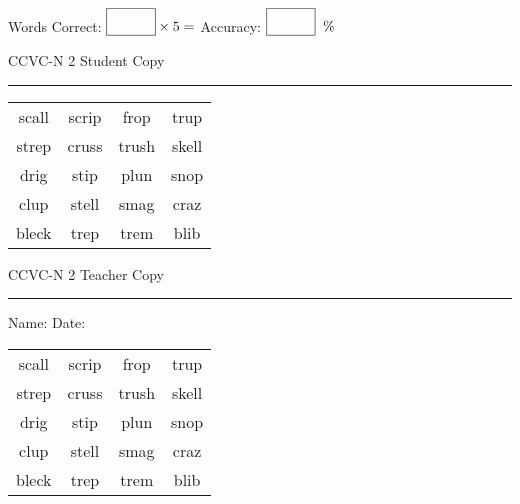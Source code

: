 \documentclass{memoir}
\begin{document}
\small

Words Correct: $\fbox{\phantom{\huge 100}} \times 5 = $ Accuracy: $\fbox{\phantom{\huge 100}}\;\; \%$ 

\vfill

\newpage


\footnotesize \noindent
CCVC-N 2 \hfill Student Copy
\smallskip
\hrule

\Large

\setlength{\tabcolsep}{14pt}
\def\arraystretch{3}

{\selectfont


\begin{vplace}[0.5]
\begin{center}
\begin{tabular}{cccc}
scall & scrip & frop & trup       \\
strep & cruss & trush & skell \\
drig        & stip & plun & snop \\
clup & stell & smag & craz        \\
bleck & trep & trem & blib             \\
\end{tabular}
\end{center}
\end{vplace}

}

\newpage

\footnotesize \noindent
CCVC-N 2 \hfill Teacher Copy
\smallskip
\hrule

\small

\vfill

\noindent
Name: \underline{\hspace{1.75in}} \hfill Date: \underline{\hspace{1in}}

\Large

{\selectfont


\begin{vplace}[0.5]
\begin{center}
\begin{tabular}{cccc}
scall & scrip & frop & trup       \\
strep & cruss & trush & skell \\
drig        & stip & plun & snop \\
clup & stell & smag & craz        \\
bleck & trep & trem & blib             \\
\end{tabular}
\end{center}
\end{vplace}



}
\end{document}
